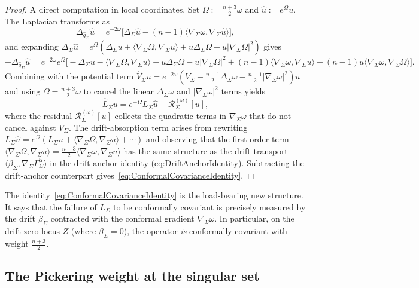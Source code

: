 \begin{proof}
A direct computation in local coordinates. Set $\Omega:=\frac{n+3}{2}\omega$ and $\hat u:=e^{\Omega}u$. The Laplacian transforms as
\[
    \Delta_{\hat g_\Sigma}\hat u
    =
    e^{-2\omega}\bigl[\Delta_\Sigma\hat u-(n-1)\langle\nabla_\Sigma\omega,\nabla_\Sigma\hat u\rangle\bigr],
\]
and expanding $\Delta_\Sigma\hat u=e^{\Omega}(\Delta_\Sigma u+\langle\nabla_\Sigma\Omega,\nabla_\Sigma u\rangle+u\Delta_\Sigma\Omega+u|\nabla_\Sigma\Omega|^2)$ gives
\[
    -\Delta_{\hat g_\Sigma}\hat u
    =
    e^{-2\omega}e^{\Omega}\bigl[-\Delta_\Sigma u-\langle\nabla_\Sigma\Omega,\nabla_\Sigma u\rangle-u\Delta_\Sigma\Omega-u|\nabla_\Sigma\Omega|^2+(n-1)\langle\nabla_\Sigma\omega,\nabla_\Sigma u\rangle+(n-1)u\langle\nabla_\Sigma\omega,\nabla_\Sigma\Omega\rangle\bigr].
\]
Combining with the potential term $\widehat V_\Sigma u=e^{-2\omega}(V_\Sigma-\tfrac{n-1}{2}\Delta_\Sigma\omega-\tfrac{n-1}{2}|\nabla_\Sigma\omega|^2)u$ and using $\Omega=\frac{n+3}{2}\omega$ to cancel the linear $\Delta_\Sigma\omega$ and $|\nabla_\Sigma\omega|^2$ terms yields
\[
    \widehat L_\Sigma u
    =
    e^{-\Omega}L_\Sigma\hat u-\mathcal R_\Sigma^{(\omega)}[u],
\]
where the residual $\mathcal R_\Sigma^{(\omega)}[u]$ collects the quadratic terms in $\nabla_\Sigma\omega$ that do not cancel against $V_\Sigma$. The drift-absorption term arises from rewriting $L_\Sigma\hat u=e^{\Omega}(L_\Sigma u+\langle\nabla_\Sigma\Omega,\nabla_\Sigma u\rangle+\cdots)$ and observing that the first-order term $\langle\nabla_\Sigma\Omega,\nabla_\Sigma u\rangle=\frac{n+3}{2}\langle\nabla_\Sigma\omega,\nabla_\Sigma u\rangle$ has the same structure as the drift transport $\langle\beta_\Sigma,\nabla_\Sigma\Gamma_\Sigma^{\mathbf b}\rangle$ in the drift-anchor identity (eq:DriftAnchorIdentity). Subtracting the drift-anchor counterpart gives~\eqref{eq:ConformalCovarianceIdentity}.
\end{proof}

The identity~\eqref{eq:ConformalCovarianceIdentity} is the load-bearing new structure. It says that the failure of $L_\Sigma$ to be conformally covariant is precisely measured by the drift $\beta_\Sigma$ contracted with the conformal gradient $\nabla_\Sigma\omega$. In particular, on the drift-zero locus $Z$ (where $\beta_\Sigma=0$), the operator \emph{is} conformally covariant with weight $\frac{n+3}{2}$.

\subsection{The Pickering weight at the singular set}

